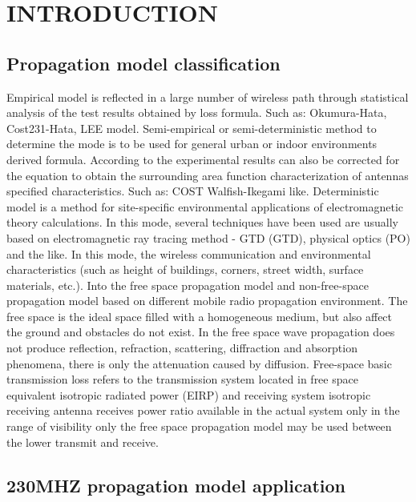 \documentclass[12pt,a4paper,twocolumn,fleqn]{narms}
\begin{document}
\maketitle

\section{INTRODUCTION}

\subsection{Propagation model classification}

Empirical model is reflected in a large number of wireless path through statistical analysis of the test results obtained by loss formula. Such as: Okumura-Hata, Cost231-Hata, LEE model\cite{dd}. 
Semi-empirical or semi-deterministic method to determine the mode is to be used for general urban or indoor environments derived formula. According to the experimental results can also be corrected for the equation to obtain the surrounding area function characterization of antennas specified characteristics. Such as: COST Walfish-Ikegami like. 
Deterministic model is a method for site-specific environmental applications of electromagnetic theory calculations. In this mode, several techniques have been used are usually based on electromagnetic ray tracing method - GTD (GTD)\cite{ee}, physical optics (PO) and the like. In this mode, the wireless communication and environmental characteristics (such as height of buildings, corners, street width, surface materials, etc.). 
Into the free space propagation model and non-free-space propagation model based on different mobile radio propagation environment. 
The free space is the ideal space filled with a homogeneous medium, but also affect the ground and obstacles do not exist. In the free space wave propagation does not produce reflection, refraction, scattering, diffraction and absorption phenomena, there is only the attenuation caused by diffusion. Free-space basic transmission loss refers to the transmission system located in free space equivalent isotropic radiated power (EIRP) and receiving system isotropic receiving antenna\cite{cs02} receives power ratio available in the actual system only in the range of visibility only the free space propagation model may be used between the lower transmit and receive.

\subsection{230MHZ propagation model application}
\end{document}
